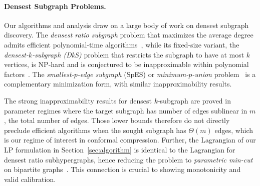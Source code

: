 \paragraph{Densest Subgraph Problems.}
Our algorithms and analysis draw on a large body of work on densest subgraph discovery. The \emph{densest ratio subgraph} problem that maximizes the average degree admits efficient polynomial-time algorithms~\cite{goldberg1984finding,charikar2000greedy}, while its fixed-size variant, the \emph{densest-$k$-subgraph (DkS)} problem that restricts the subgraph to have at most $k$ vertices, is NP-hard and is conjectured to be inapproximable within polynomial factors~\cite{feige2001dense,bhaskara2010dks,manurangsi2017hardness}. The \emph{smallest-$p$-edge subgraph} (SpES) or \emph{minimum-$p$-union} problem~\cite{chlamtac2016dks} is a complementary minimization form, with similar inapproximability results.

The strong inapproximability results for densest $k$-subgraph are proved in parameter regimes where the target subgraph has number of edges sublinear in $m$, the total number of edges.  Those lower bounds therefore do not directly preclude efficient algorithms when the sought subgraph has $\Theta(m)$ edges, which is our regime of interest in conformal compression.  Further, the Lagrangian of our LP formulation in Section~\ref{sec:algorithm} is identical to the Lagrangian for densest ratio subhypergraphs, hence reducing the problem to \emph{parametric min-cut} on bipartite graphs~\cite{goldberg1984finding,gallo1989fast,ChekuriQT}. This connection is crucial to showing monotonicity and valid calibration. %


